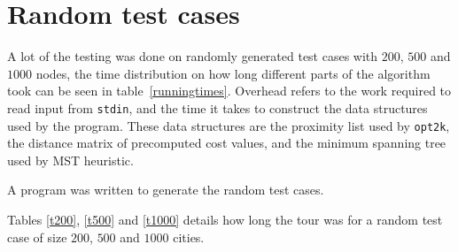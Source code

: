 \documentclass{report}
\begin{document}
\section{Random test cases}
A lot of the testing was done on randomly generated test cases with $200$, $500$ and $1000$ nodes, the time distribution on how long different parts of the algorithm took can be seen in table~\ref{runningtimes}. Overhead refers to the work required to read input from \verb!stdin!, and the time it takes to construct the data structures used by the program. These data structures are the proximity list used by \verb!opt2k!, the distance matrix of precomputed cost values, and the minimum spanning tree used by MST heuristic.

A program was written to generate the random test cases.

Tables \ref{t200}, \ref{t500} and \ref{t1000} details how long the tour was for a random test case of size $200$, $500$ and $1000$ cities. 

    
\end{document}

